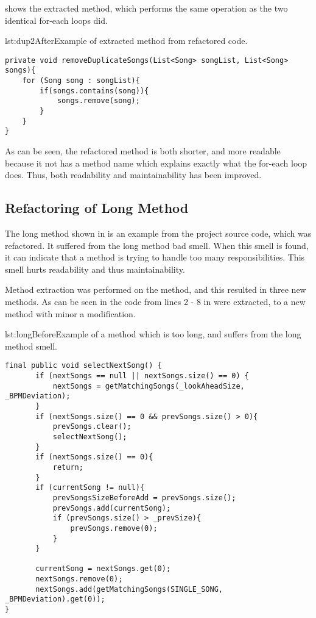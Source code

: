  shows the extracted method, which performs the same operation as the two identical for-each loops did.

\begin{code}{lst:dup2After}{Example of extracted method from refactored code.}
\begin{lstlisting}
private void removeDuplicateSongs(List<Song> songList, List<Song> songs){
    for (Song song : songList){
        if(songs.contains(song)){
            songs.remove(song);
        }
    }
}
\end{lstlisting}
\end{code}

As can be seen, the refactored method is both shorter, and more readable because it not has a method name which explains exactly what the for-each loop does. Thus, both readability and maintainability has been improved.
\subsection{Refactoring of Long Method}
The long method shown in  is an example from the project source code, which was refactored. It suffered from the long method bad smell. When this smell is found, it can indicate that a method is trying to handle too many responsibilities. This smell hurts readability and thus maintainability.

Method extraction was performed on the method, and this resulted in three new methods. As can be seen in  the code from lines 2 - 8 in 
 were extracted, to a new method with minor a modification. 

\begin{code}{lst:longBefore}{Example of a method which is too long, and suffers from the long method smell.}
\begin{lstlisting}
final public void selectNextSong() {
       if (nextSongs == null || nextSongs.size() == 0) {
           nextSongs = getMatchingSongs(_lookAheadSize, _BPMDeviation);
       }
       if (nextSongs.size() == 0 && prevSongs.size() > 0){
           prevSongs.clear();
           selectNextSong();
       }
       if (nextSongs.size() == 0){
           return; 
       }
       if (currentSong != null){
           prevSongsSizeBeforeAdd = prevSongs.size();
           prevSongs.add(currentSong);
           if (prevSongs.size() > _prevSize){
               prevSongs.remove(0);
           }
       }

       currentSong = nextSongs.get(0);
       nextSongs.remove(0);
       nextSongs.add(getMatchingSongs(SINGLE_SONG, _BPMDeviation).get(0));
}
\end{lstlisting}
\end{code}

